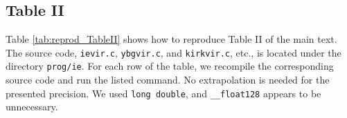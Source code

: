 \documentclass[preprint]{revtex4-1}
\numberwithin{equation}{subsection}
\numberwithin{table}{section}
\begin{document}
%
%
%
%
%



\subsection{Table II}


Table \ref{tab:reprod_TableII}
shows how to reproduce Table II of the main text.
%
The source code,
\texttt{ievir.c}, \texttt{ybgvir.c}, and \texttt{kirkvir.c}, etc.,
is located under the directory
\texttt{prog/ie}.
%
For each row of the table,
we recompile the corresponding source code
and run the listed command.
%
No extrapolation is needed for the presented precision.
%
We used \texttt{long double},
and \texttt{\_\_float128} appears to be unnecessary.
%
\end{document}
